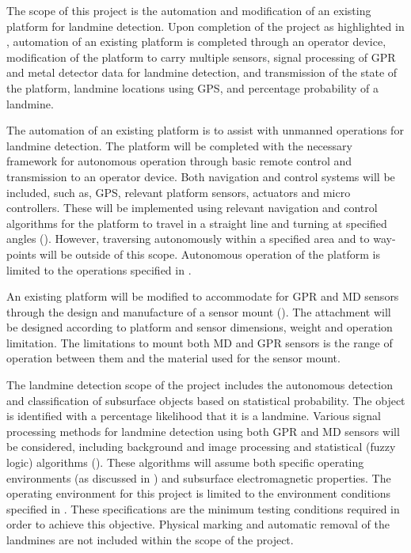 \documentclass[main.tex]{subfiles}
\begin{document}
The scope of this project is the automation and modification of an existing platform for landmine detection. Upon completion of the project as highlighted in , automation of an existing platform is completed through an operator device, modification of the platform to carry multiple sensors, signal processing of GPR and metal detector data for landmine detection, and transmission of the state of the platform, landmine locations using GPS, and percentage probability of a landmine.

The automation of an existing platform is to assist with unmanned operations for landmine detection. The platform will be completed with the necessary framework for autonomous operation through basic remote control and transmission to an operator device. Both navigation and control systems will be included, such as, GPS, relevant platform sensors, actuators and micro controllers. These will be implemented using relevant navigation and control algorithms for the platform to travel in a straight line and turning at specified angles (). However, traversing autonomously within a specified area and to way-points will be outside of this scope. Autonomous operation of the platform is limited to the operations specified in . 

An existing platform will be modified to accommodate for GPR and MD sensors through the design and manufacture of a sensor mount (). The attachment will be designed according to platform and sensor dimensions, weight and operation limitation. The limitations to mount both MD and GPR sensors is the range of operation between them and the material used for the sensor mount.

The landmine detection scope of the project includes the autonomous detection and classification of subsurface objects based on statistical probability. The object is identified with a percentage likelihood that it is a landmine. Various signal processing methods for landmine detection using both GPR and MD sensors will be considered, including background and image processing and statistical (fuzzy logic) algorithms (). These algorithms will assume both specific operating environments (as discussed in ) and subsurface electromagnetic properties. The operating environment for this project is limited to the environment conditions specified in . These specifications are the minimum testing conditions required in order to achieve this objective. Physical marking and automatic removal of the landmines are not included within the scope of the project. 
\end{document}
